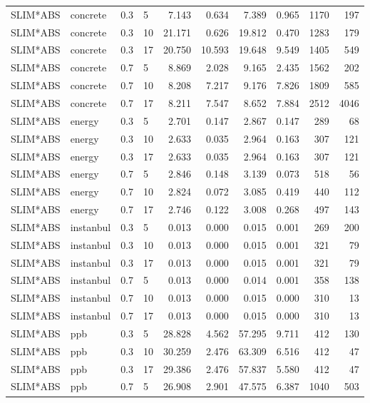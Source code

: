 \begin{longtable}{llllrrrrrr}
\midrule
SLIM*ABS & concrete & 0.3 & 5 & 7.143 & 0.634 & 7.389 & 0.965 & 1170 & 197 \\
SLIM*ABS & concrete & 0.3 & 10 & 21.171 & 0.626 & 19.812 & 0.470 & 1283 & 179 \\
SLIM*ABS & concrete & 0.3 & 17 & 20.750 & 10.593 & 19.648 & 9.549 & 1405 & 549 \\
SLIM*ABS & concrete & 0.7 & 5 & 8.869 & 2.028 & 9.165 & 2.435 & 1562 & 202 \\
SLIM*ABS & concrete & 0.7 & 10 & 8.208 & 7.217 & 9.176 & 7.826 & 1809 & 585 \\
SLIM*ABS & concrete & 0.7 & 17 & 8.211 & 7.547 & 8.652 & 7.884 & 2512 & 4046 \\
\midrule
SLIM*ABS & energy & 0.3 & 5 & 2.701 & 0.147 & 2.867 & 0.147 & 289 & 68 \\
SLIM*ABS & energy & 0.3 & 10 & 2.633 & 0.035 & 2.964 & 0.163 & 307 & 121 \\
SLIM*ABS & energy & 0.3 & 17 & 2.633 & 0.035 & 2.964 & 0.163 & 307 & 121 \\
SLIM*ABS & energy & 0.7 & 5 & 2.846 & 0.148 & 3.139 & 0.073 & 518 & 56 \\
SLIM*ABS & energy & 0.7 & 10 & 2.824 & 0.072 & 3.085 & 0.419 & 440 & 112 \\
SLIM*ABS & energy & 0.7 & 17 & 2.746 & 0.122 & 3.008 & 0.268 & 497 & 143 \\
\midrule
SLIM*ABS & instanbul & 0.3 & 5 & 0.013 & 0.000 & 0.015 & 0.001 & 269 & 200 \\
SLIM*ABS & instanbul & 0.3 & 10 & 0.013 & 0.000 & 0.015 & 0.001 & 321 & 79 \\
SLIM*ABS & instanbul & 0.3 & 17 & 0.013 & 0.000 & 0.015 & 0.001 & 321 & 79 \\
SLIM*ABS & instanbul & 0.7 & 5 & 0.013 & 0.000 & 0.014 & 0.001 & 358 & 138 \\
SLIM*ABS & instanbul & 0.7 & 10 & 0.013 & 0.000 & 0.015 & 0.000 & 310 & 13 \\
SLIM*ABS & instanbul & 0.7 & 17 & 0.013 & 0.000 & 0.015 & 0.000 & 310 & 13 \\
\midrule
SLIM*ABS & ppb & 0.3 & 5 & 28.828 & 4.562 & 57.295 & 9.711 & 412 & 130 \\
SLIM*ABS & ppb & 0.3 & 10 & 30.259 & 2.476 & 63.309 & 6.516 & 412 & 47 \\
SLIM*ABS & ppb & 0.3 & 17 & 29.386 & 2.476 & 57.837 & 5.580 & 412 & 47 \\
SLIM*ABS & ppb & 0.7 & 5 & 26.908 & 2.901 & 47.575 & 6.387 & 1040 & 503 \\

\end{longtable}
